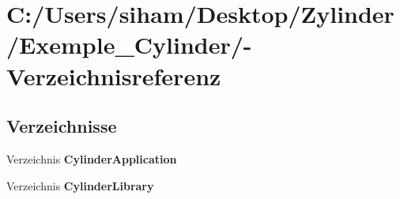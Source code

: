 \section{C:/Users/siham/Desktop/Zylinder/Exemple\_\-Cylinder/-Verzeichnisreferenz}
\label{dir_C_3A_2FUsers_2Fsiham_2FDesktop_2FZylinder_2FExemple_5FCylinder_2F}


\subsection*{Verzeichnisse}
\begin{CompactItemize}
\item 
Verzeichnis {\bf Cylinder\-Application}
\item 
Verzeichnis {\bf Cylinder\-Library}
\end{CompactItemize}
